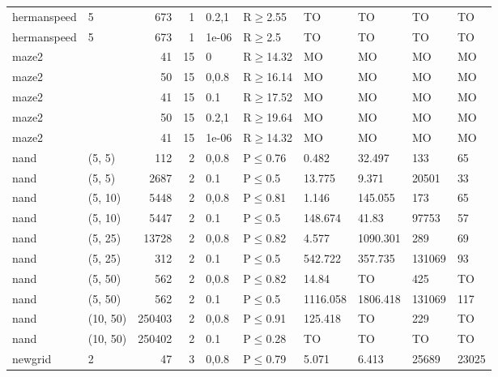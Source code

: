 \begin{longtable}{llrrllllll}
 hermanspeed   & 5        &    	673 &   1 & 0.2,1 & R$\geq$2.55  & TO       & TO       & TO      & TO     \\
 hermanspeed   & 5        &    	673 &   1 & 1e-06 & R$\geq$2.5   & TO       & TO       & TO      & TO     \\
 maze2         &          &     	41 &  15 & 0     & R$\geq$14.32 & MO       & MO       & MO      & MO     \\
 maze2         &          &     	50 &  15 & 0,0.8 & R$\geq$16.14 & MO       & MO       & MO      & MO     \\
 maze2         &          &     	41 &  15 & 0.1   & R$\geq$17.52 & MO       & MO       & MO      & MO     \\
 maze2         &          &     	50 &  15 & 0.2,1 & R$\geq$19.64 & MO       & MO       & MO      & MO     \\
 maze2         &          &     	41 &  15 & 1e-06 & R$\geq$14.32 & MO       & MO       & MO      & MO     \\
 nand          & (5, 5)   &    	112 &   2 & 0,0.8 & P$\leq$0.76  & 0.482    & 32.497   & 133     & 65     \\
 nand          & (5, 5)   &   	2687 &   2 & 0.1   & P$\leq$0.5   & 13.775   & 9.371    & 20501   & 33     \\
 nand          & (5, 10)  &   	5448 &   2 & 0,0.8 & P$\leq$0.81  & 1.146    & 145.055  & 173     & 65     \\
 nand          & (5, 10)  &   	5447 &   2 & 0.1   & P$\leq$0.5   & 148.674  & 41.83    & 97753   & 57     \\
 nand          & (5, 25)  &  	13728 &   2 & 0,0.8 & P$\leq$0.82  & 4.577    & 1090.301 & 289     & 69     \\
 nand          & (5, 25)  &    	312 &   2 & 0.1   & P$\leq$0.5   & 542.722  & 357.735  & 131069  & 93     \\
 nand          & (5, 50)  &    	562 &   2 & 0,0.8 & P$\leq$0.82  & 14.84    & TO       & 425     & TO     \\
 nand          & (5, 50)  &    	562 &   2 & 0.1   & P$\leq$0.5   & 1116.058 & 1806.418 & 131069  & 117    \\
 nand          & (10, 50) & 	250403 &   2 & 0,0.8 & P$\leq$0.91  & 125.418  & TO       & 229     & TO     \\
 nand          & (10, 50) & 	250402 &   2 & 0.1   & P$\leq$0.28  & TO       & TO       & TO      & TO     \\
 newgrid       & 2        &     	47 &   3 & 0,0.8 & P$\leq$0.79  & 5.071    & 6.413    & 25689   & 23025  \\

\end{longtable}
